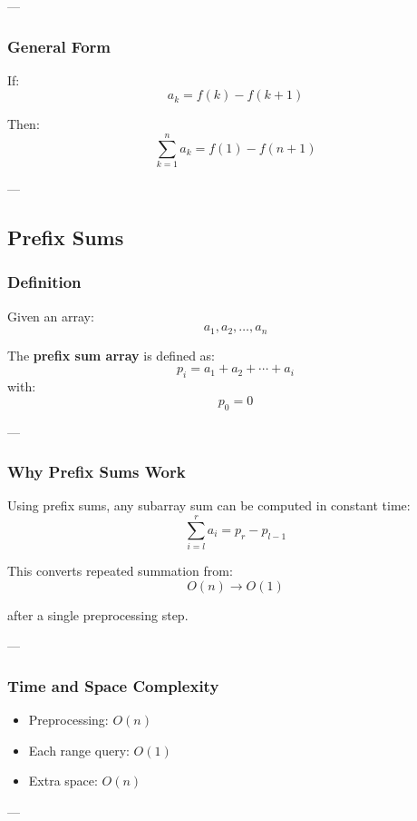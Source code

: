 \documentclass[11pt]{article}
\begin{document}
---

\subsubsection{General Form}
If:
\[
a_k = f(k) - f(k+1)
\]

Then:
\[
\sum_{k=1}^n a_k = f(1) - f(n+1)
\]

---

\subsection{Prefix Sums}

\subsubsection{Definition}

Given an array:
\[
a_1, a_2, \dots, a_n
\]

The \textbf{prefix sum array} is defined as:
\[
p_i = a_1 + a_2 + \cdots + a_i
\]
with:
\[
p_0 = 0
\]

---

\subsubsection{Why Prefix Sums Work}

Using prefix sums, any subarray sum can be computed in constant time:
\[
\sum_{i=l}^{r} a_i = p_r - p_{l-1}
\]

This converts repeated summation from:
\[
O(n) \rightarrow O(1)
\]

after a single preprocessing step.

---

\subsubsection{Time and Space Complexity}

\begin{itemize}
    \item Preprocessing: $O(n)$
    \item Each range query: $O(1)$
    \item Extra space: $O(n)$
\end{itemize}

---

\end{document}
